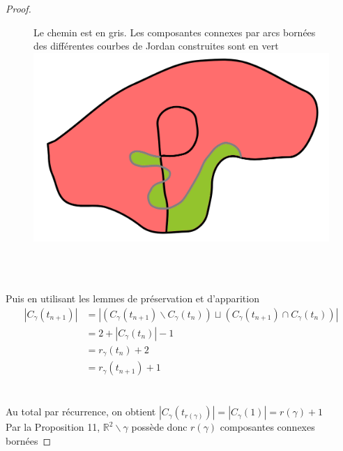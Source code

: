 \documentclass{article}
\begin{document}
\begin{flushleft}
\begin{proof}
\begin{itemize}
\begin{figure}[h]
            \centering
            Le chemin est en gris.
            Les composantes connexes par arcs bornées des différentes courbes de Jordan construites sont en vert\\
            \includegraphics*[width = 0.5 \textwidth]{Unicité cas 2.png}
        \end{figure}
        \\~\\
    \end{itemize}
    Puis en utilisant les lemmes de préservation et d'apparition
    \begin{align*}
        |C_{\gamma}(t_{n+1})| &= |(C_{\gamma}(t_{n+1}) \backslash C_{\gamma}(t_n)) \sqcup (C_{\gamma}(t_{n+1}) \cap C_{\gamma}(t_n)) |\\
        &= 2 + |C_{\gamma}(t_n)| - 1\\
        &= r_{\gamma}(t_n) + 2\\
        &= r_{\gamma}(t_{n+1}) + 1
    \end{align*}
    \\~\\
    Au total par récurrence, on obtient $|C_{\gamma}(t_{r(\gamma)})| = |C_{\gamma}(1)| = r(\gamma) + 1$\\
    Par la Proposition 11, $\mathbb{R}^2 \backslash \gamma$ possède donc $r(\gamma)$ composantes connexes bornées

\end{proof}

\end{flushleft}
\end{document}
